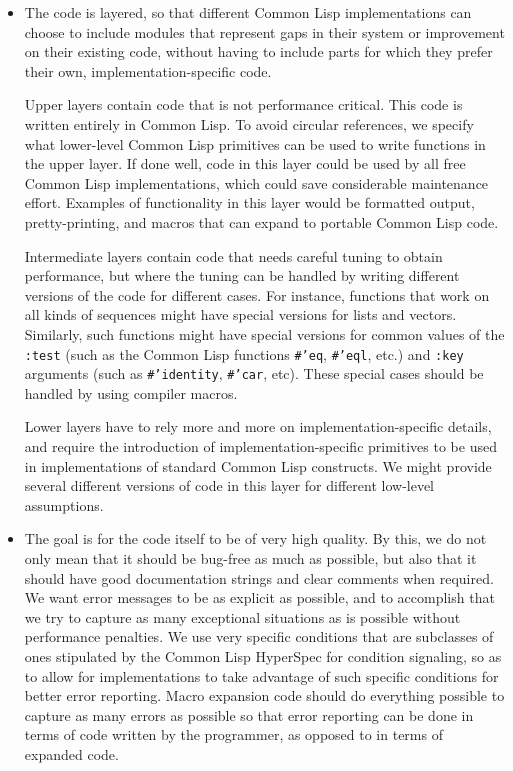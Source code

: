 \begin{itemize}
\item The code is layered, so that different Common Lisp
  implementations can choose to include \sysname{} modules that
  represent gaps in their system or improvement on their existing
  code, without having to include parts for which they prefer their
  own, implementation-specific code. 

  Upper layers contain code that is not performance critical.  This
  code is written entirely in Common Lisp.  To avoid circular
  references, we specify what lower-level Common Lisp primitives can
  be used to write functions in the upper layer.  If done well, code
  in this layer could be used by all free Common Lisp implementations,
  which could save considerable maintenance effort.  Examples of
  functionality in this layer would be formatted output,
  pretty-printing, and macros that can expand to portable Common Lisp
  code.

  Intermediate layers contain code that needs careful tuning to
  obtain performance, but where the tuning can be handled by writing
  different versions of the code for different cases.  For instance,
  functions that work on all kinds of sequences might have special
  versions for lists and vectors.  Similarly, such functions might
  have special versions for common values of the \texttt{:test} (such
  as the Common Lisp functions \texttt{\#'eq}, \texttt{\#'eql}, etc.)
  and \texttt{:key} arguments (such as \texttt{\#'identity},
  \texttt{\#'car}, etc).  These special cases should be handled by
  using compiler macros.

  Lower layers have to rely more and more on implementation-specific
  details, and require the introduction of implementation-specific
  primitives to be used in implementations of standard Common Lisp
  constructs.  We might provide several different versions of code in
  this layer for different low-level assumptions.

\item The goal is for the code itself to be of very high quality.
  By this, we do not only mean that it should be bug-free as much as
  possible, but also that it should have good documentation strings
  and clear comments when required.  We want error messages to be as
  explicit as possible, and to accomplish that we try to capture as
  many exceptional situations as is possible without performance
  penalties.  We use very specific conditions that are subclasses of
  ones stipulated by the Common Lisp HyperSpec for condition
  signaling, so as to allow for implementations to take advantage of
  such specific conditions for better error reporting.  Macro
  expansion code should do everything possible to capture as many
  errors as possible so that error reporting can be done in terms of
  code written by the programmer, as opposed to in terms of expanded
  code.

\end{itemize}

